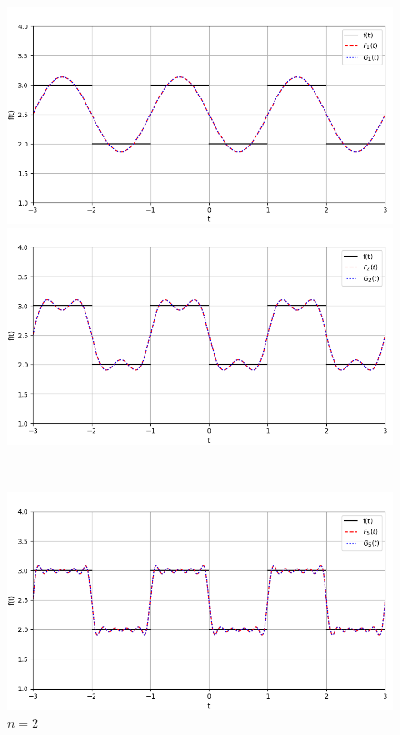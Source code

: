 \documentclass[a4paper]{article}
\begin{document}
\begin{figure}[H]
    \begin{minipage}{0.5\textwidth}
        \centering \includegraphics[width=\textwidth]{square_wave/1.png}
        \caption{$n = 1$}
    \end{minipage}\hfill
    \begin{minipage}{0.5\textwidth}
        \centering \includegraphics[width=\textwidth]{square_wave/2.png}
        \caption{$n = 2$}
    \end{minipage}\\[1em]
    \begin{minipage}{0.5\textwidth}
        \centering \includegraphics[width=\textwidth]{square_wave/5.png}

\end{minipage}
\end{figure}
\end{document}
